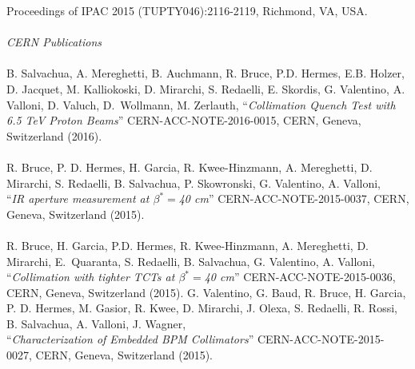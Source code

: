 Proceedings of IPAC 2015 (TUPTY046):2116-2119, Richmond, VA, USA. 
%
\\ \mbox{} \\
\textit{CERN Publications}
\\ \mbox{} \\
B. Salvachua, A. Mereghetti, B. Auchmann, R. Bruce, P.D. Hermes, E.B. Holzer, D. Jacquet, M. Kalliokoski, D. Mirarchi, S. Redaelli, E. Skordis, G. Valentino, A. Valloni, D. Valuch, \mbox{D. Wollmann}, M. Zerlauth,  
``\textit{Collimation Quench Test with 6.5 TeV Proton Beams}'' \newline
CERN-ACC-NOTE-2016-0015, CERN, Geneva, Switzerland (2016).
\\ \mbox{} \\
R. Bruce, P. D. Hermes, H. Garcia, R. Kwee-Hinzmann, A. Mereghetti, D. Mirarchi, S. Redaelli, B. Salvachua, P. Skowronski, G. Valentino, A. Valloni,  \\
``\textit{IR aperture measurement at $\beta^* =$40 cm}'' \newline
CERN-ACC-NOTE-2015-0037, CERN, Geneva, Switzerland (2015).
\\ \mbox{} \\
R. Bruce, H. Garcia, P.D. Hermes, R. Kwee-Hinzmann, A. Mereghetti, D. Mirarchi, \mbox{E. Quaranta}, S. Redaelli, B. Salvachua, G. Valentino, A. Valloni, \\ 
``\textit{Collimation with tighter TCTs at $\beta^*=$40 cm}'' \newline
CERN-ACC-NOTE-2015-0036, CERN, Geneva, Switzerland (2015).
\newpage
G. Valentino, G. Baud, R. Bruce, H. Garcia, P. D. Hermes, M. Gasior, R. Kwee, D. Mirarchi, J. Olexa, S. Redaelli, R. Rossi, B. Salvachua, A. Valloni, J. Wagner, \\
``\textit{Characterization of Embedded BPM Collimators}'' \newline
CERN-ACC-NOTE-2015-0027, CERN, Geneva, Switzerland (2015).







